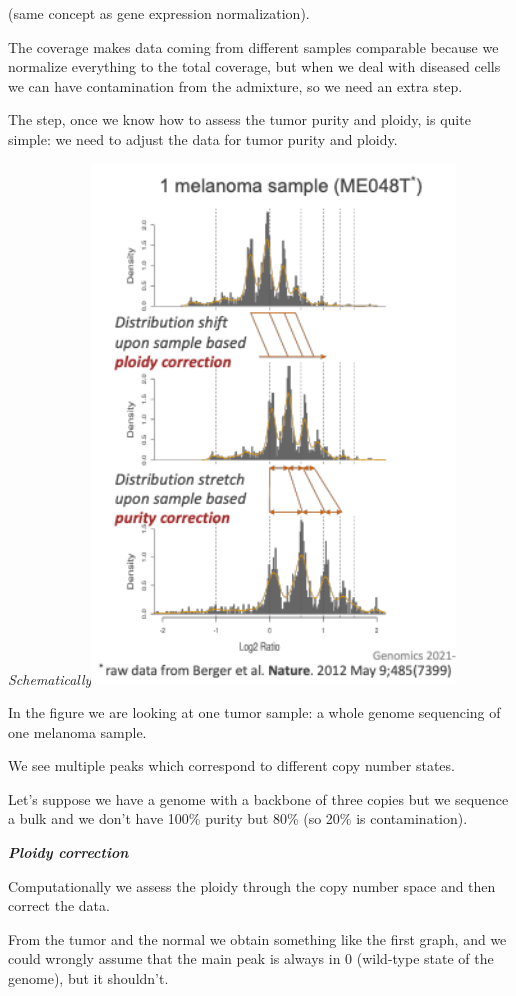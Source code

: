 (same concept as gene expression normalization).

The coverage makes data coming from different samples comparable because we
normalize everything to the total coverage, but when we deal with diseased cells
we can have contamination from the admixture, so we need an extra step.

The step, once we know how to assess the tumor purity and ploidy, is quite
simple: we need to adjust the data for tumor purity and ploidy.

\emph{Schematically}\includegraphics[width=3.79931in,height=5.42569in]{image7.png}

In the figure we are looking at one tumor sample: a whole genome sequencing of
one melanoma sample.

We see multiple peaks which correspond to different copy number states.

Let's suppose we have a genome with a backbone of three copies but we sequence a
bulk and we don't have 100\% purity but 80\% (so 20\% is contamination).

\emph{\textbf{Ploidy correction}}

Computationally we assess the ploidy through the copy number space and then
correct the data.

From the tumor and the normal we obtain something like the first graph, and we
could wrongly assume that the main peak is always in 0 (wild-type state of the
genome), but it shouldn't.

